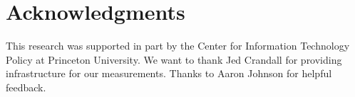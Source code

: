 \section*{Acknowledgments}
This research was supported in part by the Center for Information Technology
Policy at Princeton University.
We want to thank Jed Crandall for providing infrastructure for our measurements.
Thanks to Aaron Johnson for helpful feedback.
